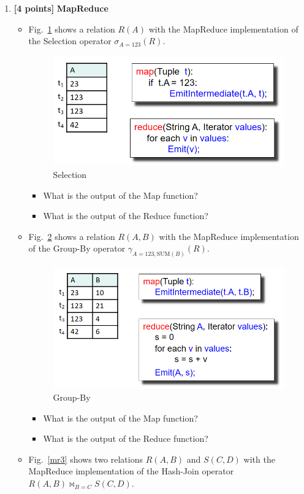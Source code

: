 \documentclass[10pt]{article}
\begin{document}
\begin{enumerate}
	\item \textbf{[4 points]} \textbf{MapReduce} \\
	      \begin{itemize}
		      \item[(a)]  Fig.~\ref{mr1} shows a relation $R(A)$ with the MapReduce implementation of the Selection operator $\sigma_{A=123}(R)$.
		            \begin{figure}[H]
			            \centering
			            \includegraphics[width=0.5\linewidth]{mr_selection}
			            \caption{Selection}
			            \label{mr1}
		            \end{figure}
		            \begin{itemize}
			            \item[(1)] What is the output of the Map function?
			            \item[(2)] What is the output of the Reduce function?
		            \end{itemize}
		      \item[(b)]  Fig.~\ref{mr2} shows a relation $R(A,B)$ with the MapReduce implementation of the Group-By operator $\gamma_{A=123,\text{SUM} (B)}(R)$.
		            \begin{figure}[H]
			            \centering
			            \includegraphics[width=0.5\linewidth]{mr_group}
			            \caption{Group-By}
			            \label{mr2}
		            \end{figure}
		            \begin{itemize}
			            \item[(1)] What is the output of the Map function?
			            \item[(2)] What is the output of the Reduce function?
		            \end{itemize}
		      \item[(c)]  Fig.~\ref{mr3} shows two relations $R(A,B)$ and $S(C,D)$ with the MapReduce implementation of the Hash-Join operator $R(A,B) \bowtie_{B=C} S(C,D)$.

\end{itemize}
\end{enumerate}
\end{document}

